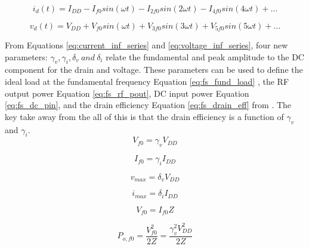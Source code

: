 \begin{equation}\label{eq:current_inf_series}
  i_{d}(t) = I_{DD} - I_{f0}sin(\omega t) - I_{2f0}sin(2\omega t) - I_{4f0}sin(4\omega t) + \ldots
\end{equation}

\begin{equation}\label{eq:voltage_inf_series}
  v_{d}(t) = V_{DD} + V_{f0}sin(\omega t) + V_{3f0}sin(3\omega t) + V_{5f0}sin(5\omega t) + \ldots
\end{equation}


From Equations \ref{eq:current_inf_series} and \ref{eq:voltage_inf_series}, four new parameters: $\gamma_v, \gamma_i, \delta_v \ and \ \delta_i$ relate the fundamental and peak amplitude to the DC component for the drain and voltage. These parameters can be used to define the ideal load at the fundamental frequency Equation \ref{eq:fs_fund_load} , the RF output power Equation \ref{eq:fs_rf_pout}, DC input power Equation \ref{eq:fs_dc_pin}, and the drain efficiency Equation \ref{eq:fs_drain_eff} from \cite{Rudiakova2006}. The key take away from the all of this is that the drain efficiency is a function of $\gamma_v$ and $\gamma_i$.
\begin{equation}\label{eq:fs_gamma_v}
  V_{f0} = \gamma_v V_{DD}
\end{equation}

\begin{equation}\label{eq:fs_gamma_i}
  I_{f0} = \gamma_i I_{DD}
\end{equation}

\begin{equation}\label{eq:fs_delta_v}
  v_{max} = \delta_v V_{DD}
\end{equation}

\begin{equation}\label{eq:fs_delta_i}
  i_{max} = \delta_i I_{DD}
\end{equation}

\begin{equation}\label{eq:fs_fund_load}
  V_{f0} = I_{f0}Z
\end{equation}

\begin{equation}\label{eq:fs_rf_pout}
  P_{o,f0} = \frac{V^2_{f0}}{2Z} = \frac{\gamma_v^2 V_{DD}^2}{2Z}
\end{equation}

